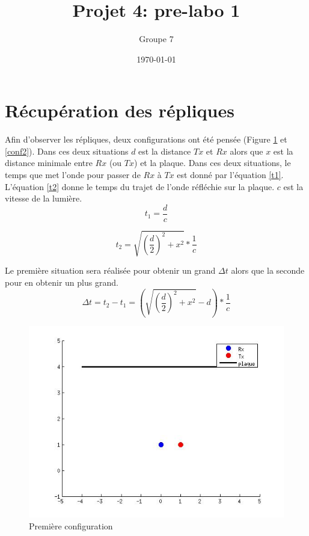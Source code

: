 \documentclass[10pt,a4paper]{article}
\begin{document}
\title{Projet 4: pre-labo 1}
\date\today
\author{Groupe 7}
\maketitle

\section{Récupération des répliques}
	Afin d'observer les répliques, deux configurations ont été pensée (Figure \ref{conf1} et \ref{conf2}). Dans ces deux situations $d$ est la distance $Tx$ et $Rx$ alors que $x$ est la distance minimale entre $Rx$ (ou $Tx$) et la plaque. Dans ces deux situations, le temps que met l'onde pour passer de $Rx$ à $Tx$ est donné par l'équation \ref{t1}. L'équation \ref{t2} donne le temps du trajet de l'onde réfléchie sur la plaque. $c$ est la vitesse de la lumière. 
	\begin{equation}
	t_1 = \frac{d}{c}
	\label{t1}
	\end{equation}
	
	\begin{equation}
	t_2 = \sqrt{(\frac{d}{2})^2 + x^2} * \frac{1}{c}
	\label{t2}
	\end{equation}
	
	Le première situation sera réalisée pour obtenir un grand $\Delta t$ alors que la seconde pour en obtenir un plus grand. 
	\begin{equation}
	\Delta t = t_2 - t_1 = (\sqrt{(\frac{d}{2})^2 + x^2} - d ) * \frac{1}{c}
	\end{equation}
	
	\begin{figure}[h]
	\centering
	\includegraphics[scale=0.4]{conf1.jpg}
	\caption{Première configuration \label{conf1} }
	\end{figure}		
	
\end{document}
